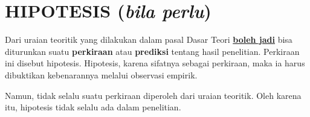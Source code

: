 \section{HIPOTESIS (\textit{bila perlu})}
Dari uraian teoritik yang dilakukan dalam pasal Dasar Teori \underline{\textbf{boleh jadi}} bisa diturunkan suatu \textbf{perkiraan} atau \textbf{prediksi} tentang hasil penelitian. Perkiraan ini disebut hipotesis. Hipotesis, karena sifatnya sebagai perkiraan, maka ia harus dibuktikan kebenarannya melalui observasi empirik. 

Namun, tidak selalu suatu perkiraan diperoleh dari uraian teoritik. Oleh karena itu, hipotesis tidak selalu ada dalam penelitian. 



